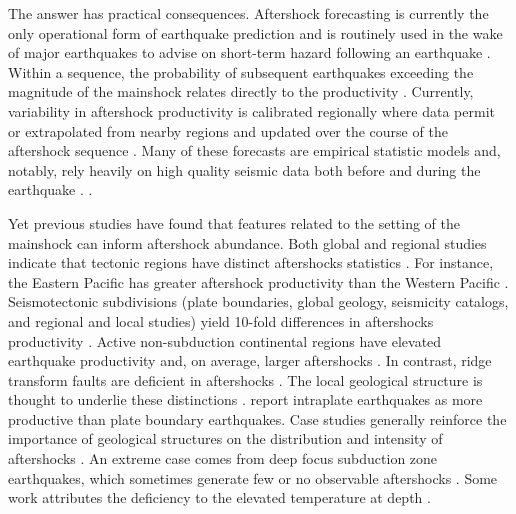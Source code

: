 \documentclass[draft, jgrga]{agujournal2018}
\begin{document}
The answer has practical consequences. Aftershock forecasting is currently the only operational form of earthquake prediction and is routinely used in the wake of major earthquakes to advise on short-term hazard following an earthquake \citep{Reasenberg1989, Page,Hardebeck2018UpdatedParameters}. Within a sequence, the probability of subsequent earthquakes exceeding the magnitude of the mainshock relates directly to the productivity \citep{Reasenberg1989, Reasenberg1999ForeshockEarthquakes}. Currently, variability in aftershock productivity is calibrated regionally where data permit or extrapolated from nearby regions and updated over the course of the aftershock sequence \citep[e.g.][]{Reasenberg1989, Reasenberg1999ForeshockEarthquakes, ogata2017statistics}. Many of these forecasts are empirical statistic models and, notably, rely heavily on high quality seismic data both before and during the earthquake \citep{Gerstenberger2005Real-timeCalifornia, Omi2015Intermediate-termApproaches}.  \citep[e.g.][]{Field2017AForecast}. 

Yet previous studies have found that features related to the setting of the mainshock can inform aftershock abundance. Both global and regional studies indicate that tectonic regions have distinct aftershocks statistics \citep{Chu2011, Page, Davidsen2015GeneralizedCalifornia, Tahir2014Aftershock2005, ogata2017statistics}. For instance, the Eastern Pacific has greater aftershock productivity than the Western Pacific \citep{Singh1911, Wetzler2016}. Seismotectonic subdivisions (plate boundaries, global geology, seismicity catalogs, and regional and local studies) yield 10-fold differences in aftershocks productivity \citep{Page}. Active non-subduction continental regions have elevated earthquake productivity and, on average, larger aftershocks \citep{Page, Mogi1967, Davis1991Single-linkVariations}. In contrast, ridge transform faults are deficient in aftershocks \citep{Davis1991Single-linkVariations, Boettcher2004EarthquakeFaults, McGuire2005}. The local geological structure is thought to underlie these distinctions \citep{Boettcher2004EarthquakeFaults, McCloskey2003StructuralAftershocks}. \citet{Yamanaka1990scalingshock} report intraplate earthquakes as more productive than plate boundary earthquakes. \citet{Zaliapin2016AClusters}  Case studies generally reinforce the importance of geological structures on the distribution and intensity of aftershocks \citep{Das2003SpatialDistribution, McCloskey2003StructuralAftershocks}. An extreme case comes from deep focus subduction zone earthquakes, which sometimes generate few or no observable aftershocks \citep{Bath1965LateralMantle, Frohlich1989TheEarthquakes, Nyffenegger2000, Wiens1997AftershockZone, Wu1999, Houston2004}. Some work attributes the deficiency to the elevated temperature at depth \citep{Nyffenegger2000, Houston2004}.
\end{document}

